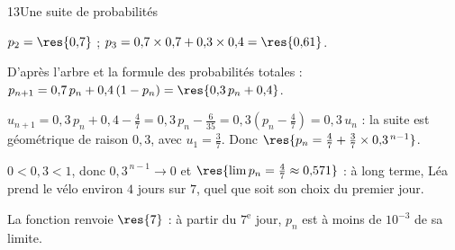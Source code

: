 \begin{corrige}{13}{Une suite de probabilités}
\noindent
\begin{minipage}[t]{0.56\linewidth}\vspace{0pt}\raggedright
\begin{questions}
  \item $p_2=\res{0{,}7}$ ; $p_3=0{,}7\times0{,}7+0{,}3\times0{,}4=\res{0{,}61}$.
  \item D'après l'arbre et la formule des probabilités totales : $p_{n+1}=0{,}7\,p_n+0{,}4\,(1-p_n)=\res{0{,}3\,p_n+0{,}4}$.
  \item $u_{n+1}=0{,}3\,p_n+0{,}4-\frac47=0{,}3\,p_n-\frac{6}{35}=0{,}3\left(p_n-\frac47\right)=0{,}3\,u_n$ : la suite est géométrique de
    raison $0{,}3$, avec $u_1=\frac37$. Donc $\res{p_n=\frac47+\frac37\times0{,}3^{\,n-1}}$.
  \item $0<0{,}3<1$, donc $0{,}3^{\,n-1}\to0$ et $\res{\lim p_n=\frac47\approx0{,}571}$ : à long terme, Léa prend le vélo environ
    $4$ jours sur $7$, quel que soit son choix du premier jour.
  \item La fonction renvoie $\res{7}$ : à partir du $7^{\text{e}}$ jour, $p_n$ est à moins de $10^{-3}$ de sa limite.
\end{questions}
\end{minipage}\hfill
\begin{minipage}[t]{0.4\linewidth}\vspace{2mm}
\centering
{}
\end{minipage}
\end{corrige}

